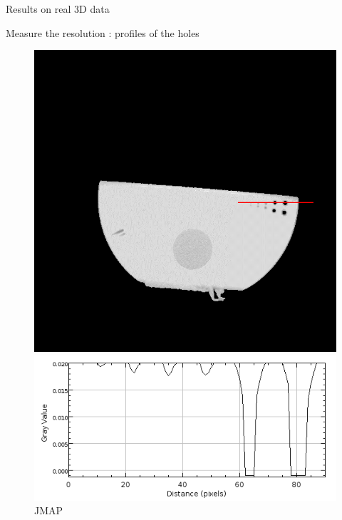 \documentclass[latex]{beamer}
\begin{document}
\begin{frame}{Results on real 3D data}
\begin{block}{Measure the resolution : profiles of the holes}
\begin{figure}
\begin{minipage}[htb]{0.46\linewidth}
\includegraphics[scale=0.27]{TraceProfileHoleHorizontal.png}
\end{minipage} \hfill
\begin{minipage}[htb]{0.46\linewidth}
\centering
\includegraphics[scale=0.30]{AnalyzeHolesVolIQI_JMAPGamma3K4Proj300.png}
\caption*{JMAP}
\end{minipage}
\label{fig:Profiles of holes for FDK (a) and JMAP (b) reconstructions}
\end{figure}
\end{block}
\end{frame}
\end{document}
